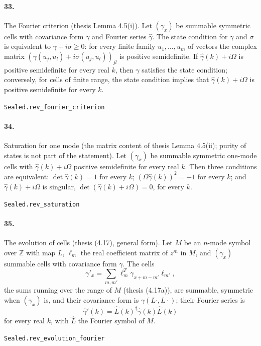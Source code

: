 \documentclass[11pt]{article}
\begin{document}
\paragraph{33.} The Fourier criterion (thesis Lemma 4.5(i)). Let $(\gamma_x)$ be summable symmetric cells with covariance form $\gamma$ and Fourier series $\hat\gamma$. The state condition for $\gamma$ and $\sigma$ is equivalent to $\gamma + i\sigma \ge 0$: for every finite family $u_1, \dots, u_m$ of vectors the complex matrix $(\gamma(u_j, u_l) + i \sigma(u_j, u_l))_{jl}$ is positive semidefinite. If $\hat\gamma(k) + i\Omega$ is positive semidefinite for every real $k$, then $\gamma$ satisfies the state condition; conversely, for cells of finite range, the state condition implies that $\hat\gamma(k) + i\Omega$ is positive semidefinite for every $k$.\par{\footnotesize\texttt{Sealed.rev\_fourier\_criterion}}

\paragraph{34.} Saturation for one mode (the matrix content of thesis Lemma 4.5(ii); purity of states is not part of the statement). Let $(\gamma_x)$ be summable symmetric one-mode cells with $\hat\gamma(k) + i\Omega$ positive semidefinite for every real $k$. Then three conditions are equivalent: $\det \hat\gamma(k) = 1$ for every $k$; $(\Omega \hat\gamma(k))^2 = -1$ for every $k$; and $\hat\gamma(k) + i\Omega$ is singular, $\det(\hat\gamma(k) + i\Omega) = 0$, for every $k$.\par{\footnotesize\texttt{Sealed.rev\_saturation}}

\paragraph{35.} The evolution of cells (thesis (4.17), general form). Let $M$ be an $n$-mode symbol over $\mathbb Z$ with map $L$, $\ell_m$ the real coefficient matrix of $z^m$ in $M$, and $(\gamma_x)$ summable cells with covariance form $\gamma$. The cells \[\gamma'_x = \sum_{m, m'} \ell_m^T \gamma_{x+m-m'} \ell_{m'},\] the sums running over the range of $M$ (thesis (4.17a)), are summable, symmetric when $(\gamma_x)$ is, and their covariance form is $\gamma(L \cdot, L \cdot)$; their Fourier series is \[\hat\gamma'(k) = \hat L(k)^\dagger \hat\gamma(k) \hat L(k)\] for every real $k$, with $\hat L$ the Fourier symbol of $M$.\par{\footnotesize\texttt{Sealed.rev\_evolution\_fourier}}
\end{document}
